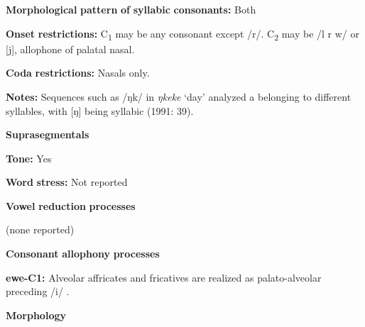 \begin{styleBody}
\textbf{Morphological} \textbf{pattern} \textbf{of} \textbf{syllabic} \textbf{consonants:} Both
\end{styleBody}

\begin{styleBody}
\textbf{Onset} \textbf{restrictions:} C\textsubscript{1} may be any consonant except /r/. C\textsubscript{2} may be /l r w/ or [j], allophone of palatal nasal.
\end{styleBody}

\begin{styleBody}
\textbf{Coda} \textbf{restrictions:} Nasals only.
\end{styleBody}

\begin{styleBody}
\textbf{Notes:} Sequences such as /ŋk/ in \textit{ŋkeke} ‘day’ analyzed a belonging to different syllables, with [ŋ] being syllabic (1991: 39).
\end{styleBody}

\begin{styleBody}
\textbf{Suprasegmentals}
\end{styleBody}

\begin{styleBody}
\textbf{Tone:} Yes
\end{styleBody}

\begin{styleBody}
\textbf{Word} \textbf{stress:} Not reported
\end{styleBody}

\begin{styleBody}
\textbf{Vowel} \textbf{reduction} \textbf{processes}
\end{styleBody}

\begin{styleBody}
(none reported)
\end{styleBody}

\begin{styleBody}
\textbf{Consonant} \textbf{allophony} \textbf{processes}
\end{styleBody}

\begin{styleBody}
\textbf{ewe-C1:} Alveolar affricates and fricatives are realized as palato-alveolar preceding /i/ \citep[9]{Jalloh2005}.
\end{styleBody}

\begin{styleBody}
\textbf{Morphology}
\end{styleBody}

